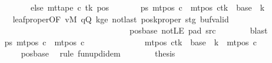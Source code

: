 \begin{isabellebody}
\ \ \ \ \ \ \ \ \ \ \ \ else\ mt{\isacharunderscore}{\kern0pt}tape\ c{\isacharprime}{\kern0pt}\ tk\ pos{\isacharparenright}{\kern0pt}{\isacharparenright}{\kern0pt}{\isachardoublequoteclose}\isanewline
\ \ \ \ \ \ \ ps{\isacharcolon}{\kern0pt}\ {\isachardoublequoteopen}mt{\isacharunderscore}{\kern0pt}pos\ c{\isacharprime}{\kern0pt}{\isacharprime}{\kern0pt}\ {\isacharequal}{\kern0pt}\ {\isacharparenleft}{\kern0pt}mt{\isacharunderscore}{\kern0pt}pos\ c{\isacharprime}{\kern0pt}{\isacharparenright}{\kern0pt}{\isacharparenleft}{\kern0pt}tk\ {\isacharcolon}{\kern0pt}{\isacharequal}{\kern0pt}\ {\isacharquery}{\kern0pt}base\ {\isacharplus}{\kern0pt}\ {\isacharquery}{\kern0pt}k{\isacharparenright}{\kern0pt}{\isachardoublequoteclose}\isanewline
\ \ \ \ \ \ \isamarkupfalse%
\ leaf{\isacharunderscore}{\kern0pt}proper{\isacharbrackleft}{\kern0pt}OF\ vM\ qQ\ kge{}\ notlast\ poskproper\ stg\ buf{\isacharunderscore}{\kern0pt}valid\isanewline
\ \ \ \ \ \ \ \ \ \ \ \ \ \ \ \ \ \ \ \ \ \ \ \ \ \ \ \ \ \ \ \ \ \ \ \ pos{\isacharunderscore}{\kern0pt}base\ notLE\ pad{}\ src{}{\isacharbrackright}{\kern0pt}\isanewline
\ \ \ \ \ \ \isamarkupfalse%
\ blast\isanewline
\ \ \ \ \isamarkupfalse%
\ ps{\isacharprime}{\kern0pt}{\isacharcolon}{\kern0pt}\ {\isachardoublequoteopen}mt{\isacharunderscore}{\kern0pt}pos\ c{\isacharprime}{\kern0pt}{\isacharprime}{\kern0pt}\ {\isacharequal}{\kern0pt}\ mt{\isacharunderscore}{\kern0pt}pos\ c{\isacharprime}{\kern0pt}{\isachardoublequoteclose}\isanewline
\ \ \ \ \isamarkupfalse%
\ {\isacharminus}{\kern0pt}\isanewline
\ \ \ \ \ \ \isamarkupfalse%
\ {\isachardoublequoteopen}{\isacharparenleft}{\kern0pt}mt{\isacharunderscore}{\kern0pt}pos\ c{\isacharprime}{\kern0pt}{\isacharparenright}{\kern0pt}{\isacharparenleft}{\kern0pt}tk\ {\isacharcolon}{\kern0pt}{\isacharequal}{\kern0pt}\ {\isacharquery}{\kern0pt}base\ {\isacharplus}{\kern0pt}\ {\isacharquery}{\kern0pt}k{\isacharparenright}{\kern0pt}\ {\isacharequal}{\kern0pt}\ mt{\isacharunderscore}{\kern0pt}pos\ c{\isacharprime}{\kern0pt}{\isachardoublequoteclose}\isanewline
\ \ \ \ \ \ \ \ \isamarkupfalse%
\ pos{\isacharunderscore}{\kern0pt}base\ \isamarkupfalse%
\ {\isacharparenleft}{\kern0pt}rule\ fun{\isacharunderscore}{\kern0pt}upd{\isacharunderscore}{\kern0pt}idem{\isacharparenright}{\kern0pt}\isanewline
\ \ \ \ \ \ \isamarkupfalse%
\ {\isacharquery}{\kern0pt}thesis\ \isamarkupfalse%

\end{isabellebody}
